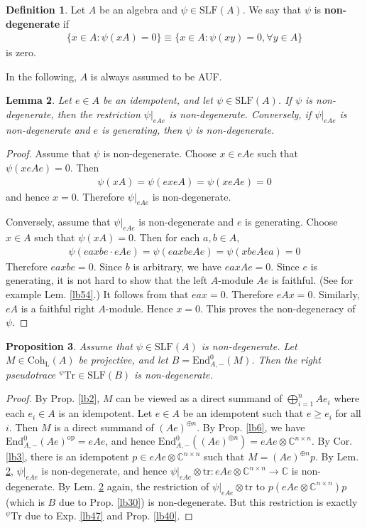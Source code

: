 \documentclass[11pt,b5paper,notitlepage]{article}
\theoremstyle{definition}
\newtheorem{df}{Definition}[section]
\theoremstyle{plain}
\newtheorem{pp}[df]{Proposition}
\newtheorem{lm}[df]{Lemma}
\newcommand{\Tr}{\mathrm{Tr}}
\newcommand{\End}{\mathrm{End}} %
\newcommand{\opp}{\mathrm{op}}
\newcommand{\Cbb}{\mathbb C}
\newcommand{\Coh}{\mathrm{Coh}_{\mathrm L}}
\newcommand{\SLF}{\mathrm{SLF}}
\newcommand{\trc}{\mathrm{tr}}
\numberwithin{equation}{section}
\begin{document}
\begin{df}
Let $A$ be an algebra and $\psi\in\SLF(A)$. We say that $\psi$ is \textbf{non-degenerate} if
\begin{align*}
\{x\in A:\psi(xA)=0\}\equiv\{x\in A:\psi(xy)=0,\forall y\in A\}
\end{align*}
is zero.
\end{df}


In the following, $A$ is always assumed to be AUF.


\begin{lm}\label{lb60}
Let $e\in A$ be an idempotent, and let $\psi\in\SLF(A)$. If $\psi$ is non-degenerate, then the restriction $\psi|_{eAe}$ is non-degenerate. Conversely, if $\psi|_{eAe}$ is non-degenerate and $e$ is generating, then $\psi$ is non-degenerate.
\end{lm}

\begin{proof}
Assume that $\psi$ is non-degenerate. Choose $x\in eAe$ such that $\psi(xeAe)=0$. Then
\begin{align*}
\psi(xA)=\psi(exeA)=\psi(xeAe)=0
\end{align*}
and hence $x=0$. Therefore $\psi|_{eAe}$ is non-degenerate.

Conversely, assume that $\psi|_{eAe}$ is non-degenerate and $e$ is generating. Choose $x\in A$ such that $\psi(xA)=0$. Then for each $a,b\in A$,
\begin{align*}
\psi(eaxbe\cdot eAe)=\psi(eaxbeAe)=\psi(xbeAea)=0
\end{align*}
Therefore $eaxbe=0$. Since $b$ is arbitrary, we have  $eaxAe=0$. Since $e$ is generating, it is not hard to show that the left $A$-module $Ae$ is faithful. (See for example Lem. \ref{lb54}.) It follows from  that $eax=0$. Therefore $eAx=0$. Similarly, $eA$ is a faithful right $A$-module. Hence $x=0$. This proves the non-degeneracy of $\psi$.
\end{proof}


\begin{pp}
Assume that $\psi\in\SLF(A)$ is non-degenerate. Let $M\in\Coh(A)$ be projective, and let $B=\End^0_{A,-}(M)$.  Then the right pseudotrace ${}^\psi\Tr\in\SLF(B)$ is non-degenerate.
\end{pp}


\begin{proof}
By Prop. \ref{lb2}, $M$ can be viewed as a direct summand of $\bigoplus_{i=1}^n Ae_i$ where each $e_i\in A$ is an idempotent. Let $e\in A$ be an idempotent such that $e\geq e_i$ for all $i$. Then $M$ is a direct summand of $(Ae)^{\oplus n}$. By Prop. \ref{lb6}, we have $\End^0_{A,-}(Ae)^\opp=eAe$, and hence $\End^0_{A,-}((Ae)^{\oplus n})= eAe\otimes\Cbb^{n\times n}$. By Cor. \ref{lb3}, there is an idempotent $p\in eAe\otimes\Cbb^{n\times n}$ such that $M=(Ae)^{\oplus n}p$. By Lem. \ref{lb60}, $\psi|_{eAe}$ is non-degenerate, and hence $\psi|_{eAe}\otimes\trc:eAe\otimes\Cbb^{n\times n}\rightarrow\Cbb$ is non-degenerate. By Lem. \ref{lb60} again, the restriction of $\psi|_{eAe}\otimes\trc$ to $p(eAe\otimes\Cbb^{n\times n})p$ (which is $B$ due to Prop. \ref{lb30}) is non-degenerate. But this restriction is exactly ${}^\psi\Tr$ due to Exp. \ref{lb47} and Prop. \ref{lb40}.
\end{proof}
\end{document}

